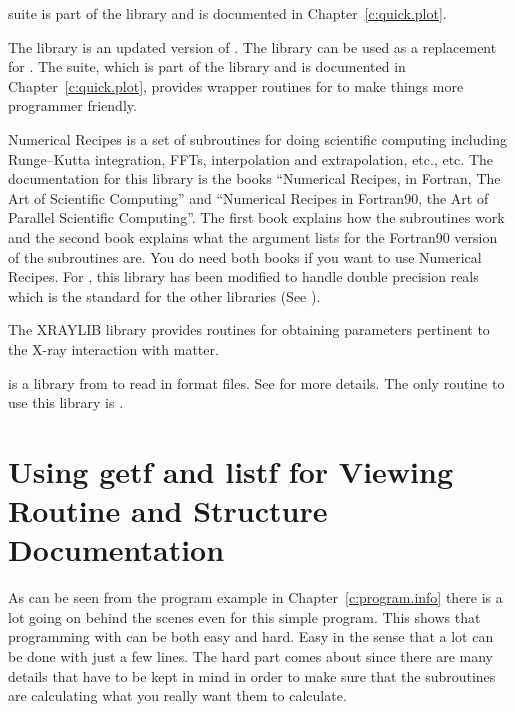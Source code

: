 {{{{{{\begin{description}
suite is part of the  library and is documented in
Chapter~\ref{c:quick.plot}.
  \item[plplot] \Newline
The  library is an updated version of . The 
library can be used as a replacement for . The 
suite, which is part of the  library and is documented in
Chapter~\ref{c:quick.plot}, provides wrapper routines for  to
make things more programmer friendly.
  \item[recipes] \Newline
Numerical Recipes is a set of subroutines for doing scientific
computing including Runge--Kutta integration, FFTs, interpolation and
extrapolation, etc., etc. The documentation for this library is the
books ``Numerical Recipes, in Fortran, The Art of Scientific
Computing'' and ``Numerical Recipes in Fortran90, the Art of Parallel
Scientific Computing''\cite{b:nr}.  The first book explains how the
subroutines work and the second book explains what the argument lists
for the Fortran90 version of the subroutines are. You do need both
books if you want to use Numerical Recipes. For \bmad, this library
has been modified to handle double precision reals which is the
standard for the other libraries (See ).
  \item[xraylib] \Newline
The XRAYLIB library provides routines for obtaining parameters
pertinent to the X-ray interaction with matter.
  \item[xsif] \Newline
{} is a library from  to read in  format files. See 
 for more details. The only
\bmad routine to use this library is .
\end{description}

\section{Using getf and listf for Viewing Routine and Structure Documentation}
\label{s:getf}

As can be seen from the program example in Chapter~\ref{c:program.info}
there is a lot going on behind the scenes even for this
simple program. This shows that programming with \bmad can be both easy
and hard. Easy in the sense that a lot can be done with just a few
lines. The hard part comes about since there are many details that
have to be kept in mind in order to make sure that the subroutines
are calculating what you really want them to calculate.

}}}}}}
